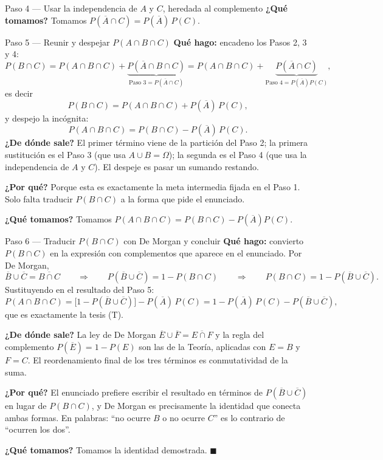 \documentclass[11pt]{article}
\begin{document}
\begin{sol}
\begin{paso}{Paso 4 --- Usar la independencia de $A$ y $C$, heredada al complemento}
\textbf{¿Qué tomamos?} Tomamos $P(\overline{A}\cap C)=P(\overline{A})\,P(C)$.
\end{paso}

\begin{paso}{Paso 5 --- Reunir y despejar $P(A\cap B\cap C)$}
\textbf{Qué hago:} encadeno los Pasos 2, 3 y 4:
\[
P(B\cap C)=P(A\cap B\cap C)+\underbrace{P(\overline{A}\cap B\cap C)}_{\text{Paso 3}=P(\overline{A}\cap C)}
=P(A\cap B\cap C)+\underbrace{P(\overline{A}\cap C)}_{\text{Paso 4}=P(\overline{A})P(C)},
\]
es decir
\[
P(B\cap C)=P(A\cap B\cap C)+P(\overline{A})\,P(C),
\]
y despejo la incógnita:
\[
P(A\cap B\cap C)=P(B\cap C)-P(\overline{A})\,P(C).
\]
\textbf{¿De dónde sale?} El primer término viene de la partición del Paso 2; la primera
sustitución es el Paso 3 (que usa $A\cup B=\Omega$); la segunda es el Paso 4 (que usa la
independencia de $A$ y $C$). El despeje es pasar un sumando restando.

\textbf{¿Por qué?} Porque esta es exactamente la meta intermedia fijada en el Paso 1. Solo
falta traducir $P(B\cap C)$ a la forma que pide el enunciado.

\textbf{¿Qué tomamos?} Tomamos $P(A\cap B\cap C)=P(B\cap C)-P(\overline{A})P(C)$.
\end{paso}

\begin{paso}{Paso 6 --- Traducir $P(B\cap C)$ con De Morgan y concluir}
\textbf{Qué hago:} convierto $P(B\cap C)$ en la expresión con complementos que aparece en el
enunciado. Por De Morgan,
\[
\overline{B}\cup\overline{C}=\overline{B\cap C}
\qquad\Longrightarrow\qquad
P(\overline{B}\cup\overline{C})=1-P(B\cap C)
\qquad\Longrightarrow\qquad
P(B\cap C)=1-P(\overline{B}\cup\overline{C}).
\]
Sustituyendo en el resultado del Paso 5:
\[
P(A\cap B\cap C)=\bigl[1-P(\overline{B}\cup\overline{C})\bigr]-P(\overline{A})\,P(C)
=1-P(\overline{A})\,P(C)-P(\overline{B}\cup\overline{C}),
\]
que es exactamente la tesis (T).

\textbf{¿De dónde sale?} La ley de De Morgan
$\overline{E}\cup\overline{F}=\overline{E\cap F}$ y la regla del complemento
$P(\overline{E})=1-P(E)$ son las de la Teoría, aplicadas con $E=B$ y $F=C$. El reordenamiento
final de los tres términos es conmutatividad de la suma.

\textbf{¿Por qué?} El enunciado prefiere escribir el resultado en términos de
$P(\overline{B}\cup\overline{C})$ en lugar de $P(B\cap C)$, y De Morgan es precisamente la
identidad que conecta ambas formas. En palabras: ``no ocurre $B$ o no ocurre $C$'' es lo
contrario de ``ocurren los dos''.

\textbf{¿Qué tomamos?} Tomamos la identidad demostrada. $\blacksquare$
\end{paso}
\end{sol}
\end{document}
